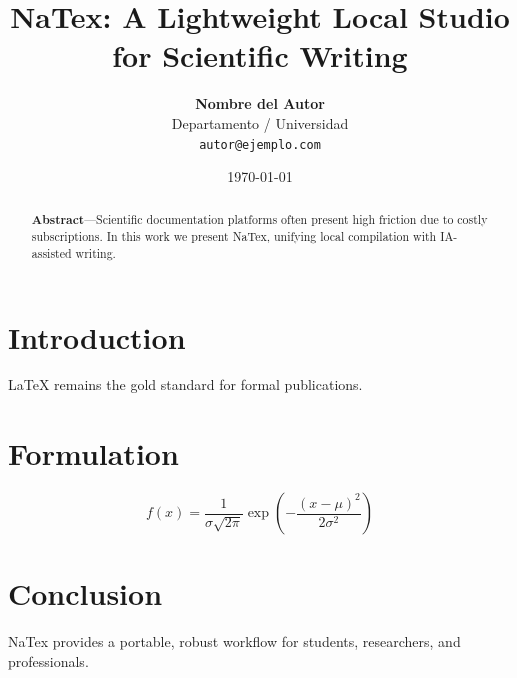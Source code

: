 \documentclass[twocolumn,10pt]{article}
\title{\Huge \bfseries \color{natexorange} NaTex: A Lightweight Local Studio for Scientific Writing}
\author{\textbf{Nombre del Autor} \\ Departamento / Universidad \\ \texttt{autor@ejemplo.com}}
\date{\today}
\begin{document}
\maketitle
\begin{abstract}
\textbf{Abstract}---Scientific documentation platforms often present high friction due to costly subscriptions. In this work we present NaTex, unifying local compilation with IA-assisted writing.
\end{abstract}

\section{Introduction}
LaTeX remains the gold standard for formal publications.

\section{Formulation}
\begin{equation}
   f(x) = \frac{1}{\sigma \sqrt{2\pi}} \exp\left( -\frac{(x - \mu)^2}{2\sigma^2} \right)
\end{equation}

\section{Conclusion}
NaTex provides a portable, robust workflow for students, researchers, and professionals.
\end{document}

